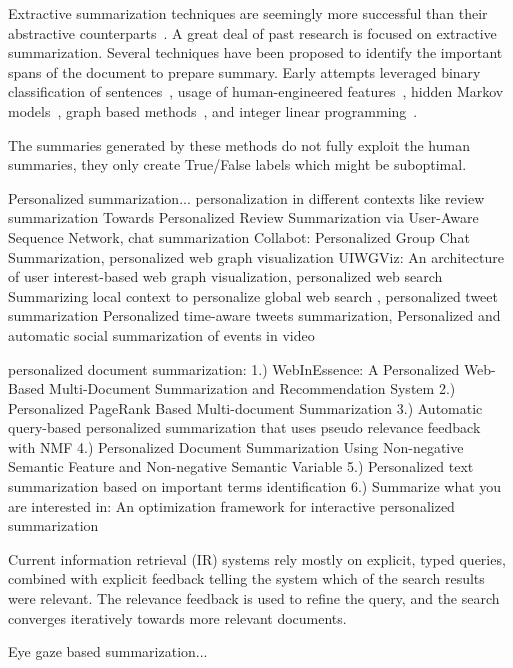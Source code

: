 \documentclass[12pt]{article}
\begin{document}
Extractive summarization techniques are seemingly more successful than their abstractive counterparts~\cite{zhang2018neural}. A great deal of past research is focused on extractive summarization. Several techniques have been proposed to identify the important spans of the document to prepare summary. Early attempts leveraged binary classification of sentences~\cite{10.1145/215206.215333}, usage of human-engineered features~\cite{filatova2004event}, hidden Markov models~\cite{conroy2001text}, graph based methods~\cite{mihalcea2005language}, and integer linear programming~\cite{woodsend2010automatic}. 


The summaries generated by these methods do not fully exploit the human summaries, they only create True/False labels which might be suboptimal.




Personalized summarization... personalization in different contexts like review summarization {Towards Personalized Review Summarization via User-Aware Sequence Network}, chat summarization {Collabot: Personalized Group Chat Summarization}, personalized web graph visualization {UIWGViz: An architecture of user interest-based web graph visualization}, personalized web search {Summarizing local context to personalize global web search}
, personalized tweet summarization {Personalized time-aware tweets summarization}, {Personalized and automatic social summarization of events in video}


personalized document summarization:
1.) WebInEssence: A Personalized Web-Based Multi-Document
Summarization and Recommendation System
2.) Personalized PageRank Based Multi-document Summarization
3.) Automatic query-based personalized summarization that uses pseudo relevance feedback with NMF
4.) Personalized Document Summarization Using Non-negative Semantic Feature and Non-negative Semantic Variable
5.) Personalized text summarization based on important terms identification
6.) Summarize what you are interested in: An optimization framework for interactive personalized summarization


Current information retrieval (IR) systems rely mostly on explicit, typed queries,
combined with explicit feedback telling the system which of the search results were
relevant. The relevance feedback is used to refine the query, and the search converges
iteratively towards more relevant documents.


Eye gaze based summarization...
   
\end{document}
